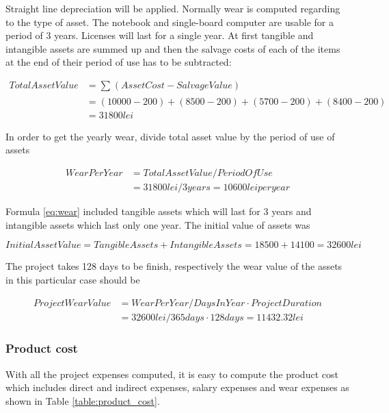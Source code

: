 Straight line depreciation will be applied. Normally wear is computed regarding to the type of asset. The notebook and single-board computer are usable for a period of 3 years. Licenses will last for a single year. At first tangible and intangible assets are summed up and then the salvage costs of each of the items at the end of their period of use has to be subtracted:

\begin{equation}
 \begin{split}
  Total Asset Value &= \sum_{} (AssetCost - Salvage Value) \\
		    &= (10000 - 200) + (8500 - 200) + (5700 - 200) + (8400 - 200) \\
		    &= 31800 lei
 \end{split}
\end{equation}

In order to get the yearly wear, divide total asset value by the period of use of assets

\begin{equation} \label{eq:wear}
 \begin{split}
  Wear Per Year &= Total Asset Value / Period Of Use \\
                &= 31800 lei/3 years= 10600 lei per year
 \end{split}
\end{equation}

Formula \eqref{eq:wear} included tangible assets which will last for 3 years and intangible assets which last only one year. The initial value of assets was

\begin{equation}
 InitialAssetValue = Tangible Assets + Intangible Assets = 18500 + 14100 = 32600 lei
\end{equation}

The project takes 128 days to be finish, respectively the wear value of the assets in this particular case should be

\begin{equation}
 \begin{split}
  ProjectWearValue &= WearPerYear / DaysInYear \cdot ProjectDuration\\
                   &= 32600 lei / 365 days \cdot 128 days = 11432.32 lei
 \end{split}
\end{equation}

\subsubsection{Product cost}
With all the project expenses computed, it is easy to compute the product cost which includes direct and indirect expenses, salary expenses and wear expenses as shown in Table \ref{table:product_cost}.

